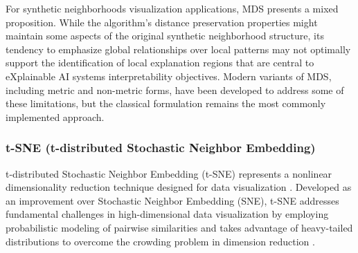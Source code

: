 For 
synthetic neighborhoods visualization applications, MDS presents a mixed proposition. While the algorithm's distance preservation properties might maintain some aspects of the original synthetic neighborhood structure, its tendency to emphasize global relationships over local patterns may not optimally support the identification of 
local explanation regions that are central to 
eXplainable AI systems
interpretability objectives. 
Modern variants of MDS, including metric and non-metric forms, have been developed to address some of these limitations, but the classical formulation remains the most commonly implemented 
approach. 

\subsubsection{t-SNE (t-distributed Stochastic Neighbor Embedding)}

t-distributed Stochastic Neighbor Embedding (t-SNE) represents a nonlinear dimensionality reduction technique designed for data visualization \cite{maaten2008tsne}. Developed as an improvement over Stochastic Neighbor Embedding (SNE), t-SNE addresses fundamental challenges in high-dimensional data visualization by employing probabilistic modeling of pairwise similarities and takes advantage of heavy-tailed distributions to overcome the crowding problem in dimension reduction \cite{maaten2008tsne}.


